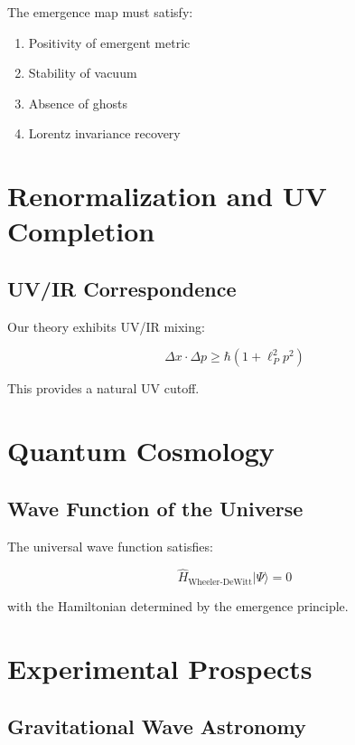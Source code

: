 \documentclass[12pt,a4paper]{article}
\begin{document}
The emergence map must satisfy:
\begin{enumerate}
\item Positivity of emergent metric
\item Stability of vacuum
\item Absence of ghosts
\item Lorentz invariance recovery
\end{enumerate}

\section{Renormalization and UV Completion}

\subsection{UV/IR Correspondence}

Our theory exhibits UV/IR mixing:

\begin{equation}
\Delta x \cdot \Delta p \geq \hbar (1 + \ell_P^2 p^2)
\end{equation}

This provides a natural UV cutoff.

\section{Quantum Cosmology}

\subsection{Wave Function of the Universe}

The universal wave function satisfies:

\begin{equation}
\hat{H}_{\text{Wheeler-DeWitt}} |\Psi\rangle = 0
\end{equation}

with the Hamiltonian determined by the emergence principle.

\section{Experimental Prospects}

\subsection{Gravitational Wave Astronomy}
\end{document}
